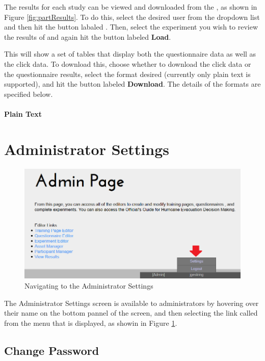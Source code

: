 \documentclass[article]{ij4uq}              %
\begin{document}
The results for each study can be viewed and downloaded from the , as shown in Figure \ref{fig:partResults}.  To do this, select the desired user from the dropdown list and then hit the button labaled .  Then, select the experiment you wish to review the results of and again hit the button labeled \textbf{Load}.

This will show a set of tables that display both the questionnaire data as well as the click data.  To download this, choose whether to download the click data or the questionnaire results, select the format desired (currently only plain text is supported), and hit the button labeled \textbf{Download}.  The details of the formats are specified below.

\paragraph{Plain Text}


\section{Administrator Settings}

\begin{figure}[h!]
 \centering
 \includegraphics[width=5.0in]{figures/findSettings.png}
 \caption{Navigating to the Administrator Settings}
 \label{fig:findSettings}
\end{figure}
\FloatBarrier

The Administrator Settings screen is available to administrators by hovering over their name on the bottom pannel of the screen, and then selecting the link called  from the menu that is displayed, as showin in Figure \ref{fig:findSettings}.

\subsection{Change Password}
\end{document}
